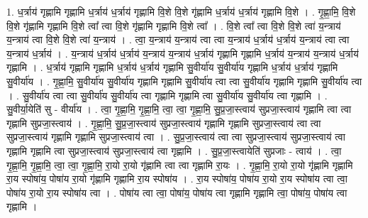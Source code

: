 \documentclass[17pt]{extarticle}
\begin{document}
1. ध॒र्त्राय॑ गृह्णामि गृह्णामि ध॒र्त्राय॑ ध॒र्त्राय॑ गृह्णामि वि॒शे वि॒शे गृ॑ह्णामि ध॒र्त्राय॑ ध॒र्त्राय॑ गृह्णामि वि॒शे । . गृ॒ह्णा॒मि॒ वि॒शे वि॒शे गृ॑ह्णामि गृह्णामि वि॒शे त्वा᳚ त्वा वि॒शे गृ॑ह्णामि गृह्णामि वि॒शे त्वा᳚ । . वि॒शे त्वा᳚ त्वा वि॒शे वि॒शे त्वा॑ य॒न्त्राय॑ य॒न्त्राय॑ त्वा वि॒शे वि॒शे त्वा॑ य॒न्त्राय॑ । . त्वा॒ य॒न्त्राय॑ य॒न्त्राय॑ त्वा त्वा य॒न्त्राय॑ ध॒र्त्राय॑ ध॒र्त्राय॑ य॒न्त्राय॑ त्वा त्वा य॒न्त्राय॑ ध॒र्त्राय॑ । . य॒न्त्राय॑ ध॒र्त्राय॑ ध॒र्त्राय॑ य॒न्त्राय॑ य॒न्त्राय॑ ध॒र्त्राय॑ गृह्णामि गृह्णामि ध॒र्त्राय॑ य॒न्त्राय॑ य॒न्त्राय॑ ध॒र्त्राय॑ गृह्णामि । . ध॒र्त्राय॑ गृह्णामि गृह्णामि ध॒र्त्राय॑ ध॒र्त्राय॑ गृह्णामि सु॒वीर्या॑य सु॒वीर्या॑य गृह्णामि ध॒र्त्राय॑ ध॒र्त्राय॑ गृह्णामि सु॒वीर्या॑य । . गृ॒ह्णा॒मि॒ सु॒वीर्या॑य सु॒वीर्या॑य गृह्णामि गृह्णामि सु॒वीर्या॑य त्वा त्वा सु॒वीर्या॑य गृह्णामि गृह्णामि सु॒वीर्या॑य त्वा । . सु॒वीर्या॑य त्वा त्वा सु॒वीर्या॑य सु॒वीर्या॑य त्वा गृह्णामि गृह्णामि त्वा सु॒वीर्या॑य सु॒वीर्या॑य त्वा गृह्णामि । . सु॒वीर्या॒येति॑ सु - वीर्या॑य । . त्वा॒ गृ॒ह्णा॒मि॒ गृ॒ह्णा॒मि॒ त्वा॒ त्वा॒ गृ॒ह्णा॒मि॒ सु॒प्र॒जा॒स्त्वाय॑ सुप्रजा॒स्त्वाय॑ गृह्णामि त्वा त्वा गृह्णामि सुप्रजा॒स्त्वाय॑ । . गृ॒ह्णा॒मि॒ सु॒प्र॒जा॒स्त्वाय॑ सुप्रजा॒स्त्वाय॑ गृह्णामि गृह्णामि सुप्रजा॒स्त्वाय॑ त्वा त्वा सुप्रजा॒स्त्वाय॑ गृह्णामि गृह्णामि सुप्रजा॒स्त्वाय॑ त्वा । . सु॒प्र॒जा॒स्त्वाय॑ त्वा त्वा सुप्रजा॒स्त्वाय॑ सुप्रजा॒स्त्वाय॑ त्वा गृह्णामि गृह्णामि त्वा सुप्रजा॒स्त्वाय॑ सुप्रजा॒स्त्वाय॑ त्वा गृह्णामि । . सु॒प्र॒जा॒स्त्वायेति॑ सुप्रजाः - त्वाय॑ । . त्वा॒ गृ॒ह्णा॒मि॒ गृ॒ह्णा॒मि॒ त्वा॒ त्वा॒ गृ॒ह्णा॒मि॒ रा॒यो रा॒यो गृ॑ह्णामि त्वा त्वा गृह्णामि रा॒यः । . गृ॒ह्णा॒मि॒ रा॒यो रा॒यो गृ॑ह्णामि गृह्णामि रा॒य स्पोषा॑य॒ पोषा॑य रा॒यो गृ॑ह्णामि गृह्णामि रा॒य स्पोषा॑य । . रा॒य स्पोषा॑य॒ पोषा॑य रा॒यो रा॒य स्पोषा॑य त्वा त्वा॒ पोषा॑य रा॒यो रा॒य स्पोषा॑य त्वा । . पोषा॑य त्वा त्वा॒ पोषा॑य॒ पोषा॑य त्वा गृह्णामि गृह्णामि त्वा॒ पोषा॑य॒ पोषा॑य त्वा गृह्णामि । \newline
\end{document}
